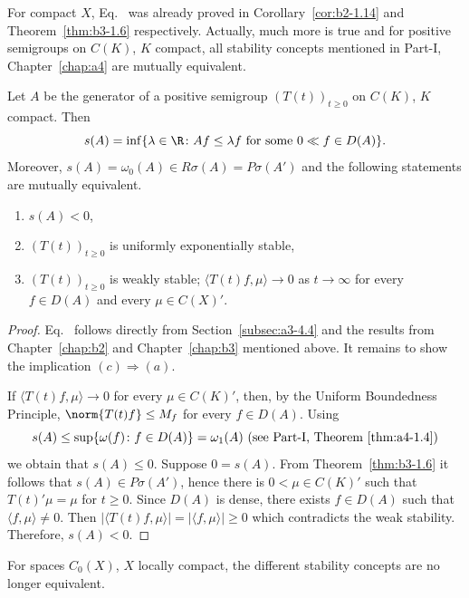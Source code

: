 For compact $X$, Eq.~ was already proved in Corollary~\ref{cor:b2-1.14} and Theorem~\ref{thm:b3-1.6} respectively. 
Actually, much more is true and for positive semigroups on $C(K)$, $K$ compact, all stability concepts mentioned in Part-I, Chapter~\ref{chap:a4} are mutually equivalent.

\begin{theorem}\label{thm:b4-1.1}%
Let $A$ be the generator of a positive semigroup $(T(t))_{t \geq 0}$ on $C(K)$, $K$ compact. Then
\begin{equation}\label{eq:b4-1.2}
   s(A) = \inf \{\lambda \in \R \colon Af \leq \lambda f \text{ for some } 0 \ll f \in D(A)\} .
\end{equation}
Moreover, $s(A) = \omega_{0}(A) \in R\sigma(A) = P\sigma(A')$ and the following statements are mutually equivalent.
\begin{enumerate}[\upshape (a)]
\item $s(A) < 0$,
\item $(T(t))_{t \geq 0}$ is uniformly exponentially stable,
\item $(T(t))_{t \geq 0}$ is weakly stable; \ie $\langle T(t)f,\mu \rangle \to 0$ as $t \to \infty$ for every $f \in D(A)$ and every $\mu \in C(X)'$.
\end{enumerate}
\end{theorem}
\begin{proof}
Eq.~ follows directly from Section~\ref{subsec:a3-4.4} and the results from Chapter~\ref{chap:b2} and Chapter~\ref{chap:b3} mentioned above. 
It remains to show the implication $(c) \Rightarrow (a)$.

If\/ $\langle T(t)f,\mu \rangle \to 0$ for every $\mu \in C(K)'$, then, by the Uniform Boundedness Principle, $\norm{T(t)f} \leq M_f$ for every $f \in D(A)$. 
Using 
\[
s(A) \leq \sup \{\omega(f)\colon f \in D(A)\} = \omega_1(A)
\text{ (see Part-I, Theorem~\ref{thm:a4-1.4})}
\]
we obtain that $s(A) \leq 0$. 
Suppose $0 = s(A)$. 
From Theorem~\ref{thm:b3-1.6} it follows that $s(A) \in P\sigma(A')$, hence there is $0 < \mu \in C(K)'$ such that $T(t)'\mu = \mu$ for $t \geq 0$. 
Since $D(A)$ is dense, there exists $f \in D(A)$ such that $\langle f,\mu \rangle \neq 0$. 
Then $|\langle T(t)f,\mu \rangle| = |\langle f,\mu \rangle|  \ge  0$ which contradicts the weak stability. Therefore, $s(A) < 0$.
\end{proof}
For spaces $C_{0}(X)$, $X$ locally compact, the different stability concepts are no longer equivalent.

